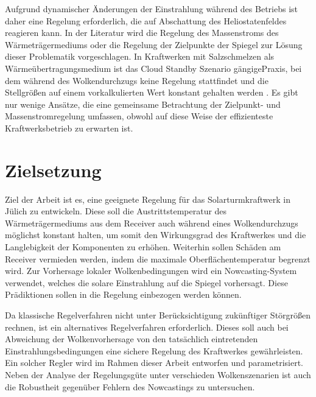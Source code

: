 Aufgrund dynamischer Änderungen der Einstrahlung während des Betriebs ist daher eine Regelung erforderlich, die auf Abschattung des Heliostatenfeldes reagieren kann.
In der Literatur wird die Regelung des Massenstroms des Wärmeträgermediums oder die Regelung der Zielpunkte der Spiegel zur Lösung dieser Problematik vorgeschlagen.
In Kraftwerken mit Salzschmelzen als Wärmeübertragungsmedium ist das Cloud Standby Szenario gängige\linebreak Praxis, bei dem während des Wolkendurchzugs keine Regelung stattfindet und die Stellgrößen auf einem vorkalkulierten Wert konstant gehalten werden \cite[S.25ff]{Zavoico}.
Es gibt nur wenige Ansätze, die eine gemeinsame Betrachtung der Zielpunkt- und Massenstromregelung umfassen, obwohl auf diese Weise der effizienteste Kraftwerksbetrieb zu erwarten ist.


\section{Zielsetzung} \label{sec_Zielsetzung}
Ziel der Arbeit ist es, eine geeignete Regelung für das Solarturmkraftwerk in Jülich zu entwickeln.
Diese soll die Austrittstemperatur des Wärmeträgermediums aus dem Receiver auch während eines Wolkendurchzugs möglichst konstant halten, um somit den Wirkungsgrad des Kraftwerkes und die Langlebigkeit der Komponenten zu erhöhen.
Weiterhin sollen Schäden am Receiver vermieden werden, indem die maximale Oberflächentemperatur begrenzt wird.
Zur Vorhersage lokaler Wolkenbedingungen wird ein Nowcasting-System verwendet, welches die solare Einstrahlung auf die Spiegel vorhersagt.
Diese Prädiktionen sollen in die Regelung einbezogen werden können.

Da klassische Regelverfahren nicht unter Berücksichtigung zukünftiger Störgrößen rechnen, ist ein alternatives Regelverfahren erforderlich.
Dieses soll auch bei Abweichung der Wolkenvorhersage von den tatsächlich eintretenden Einstrahlungsbedingungen eine sichere Regelung des Kraftwerkes gewährleisten.
Ein solcher Regler wird im Rahmen dieser Arbeit entworfen und parametrisiert.
Neben der Analyse der Regelungsgüte unter verschieden Wolkenszenarien ist auch die Robustheit gegenüber Fehlern des Nowcastings zu untersuchen.


